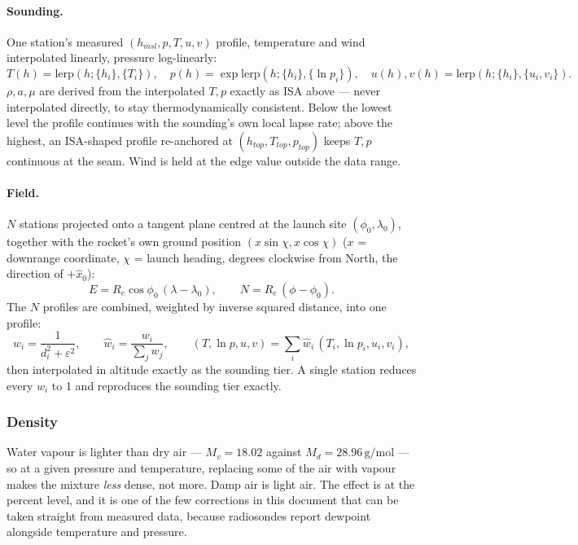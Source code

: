 \paragraph{Sounding.} One station's measured $(h_{msl}, p, T, u, v)$ profile, temperature and wind
interpolated linearly, pressure log-linearly:
\begin{equation}
    T(h) = \mathrm{lerp}(h;\{h_i\},\{T_i\}), \quad
    p(h) = \exp\mathrm{lerp}(h;\{h_i\},\{\ln p_i\}), \quad
    u(h),v(h) = \mathrm{lerp}(h;\{h_i\},\{u_i,v_i\}).
\end{equation}
$\rho, a, \mu$ are derived from the interpolated $T, p$ exactly as ISA above --- never interpolated
directly, to stay thermodynamically consistent. Below the lowest level the profile continues with
the sounding's own local lapse rate; above the highest, an ISA-shaped profile re-anchored at
$(h_{top}, T_{top}, p_{top})$ keeps $T, p$ continuous at the seam. Wind is held at the edge value
outside the data range.

\paragraph{Field.} $N$ stations projected onto a tangent plane centred at the launch site
$(\phi_0,\lambda_0)$, together with the rocket's own ground position $(x\sin\chi, x\cos\chi)$
($x$ = downrange coordinate, $\chi$ = launch heading, degrees clockwise from North, the direction
of $+\hat{x}_0$):
\begin{equation}
    E = R_e\cos\phi_0\,(\lambda-\lambda_0), \qquad N = R_e\,(\phi-\phi_0).
\end{equation}
The $N$ profiles are combined, weighted by inverse squared distance, into one profile:
\begin{equation}
    w_i = \frac{1}{d_i^2+\varepsilon^2}, \qquad \hat{w}_i = \frac{w_i}{\sum_j w_j}, \qquad
    (T, \ln p, u, v) = \sum_i \hat{w}_i\,(T_i, \ln p_i, u_i, v_i),
\end{equation}
then interpolated in altitude exactly as the sounding tier. A single station reduces every
$\hat{w}_i$ to 1 and reproduces the sounding tier exactly.

\subsubsection{Density}\label{sec:density}
Water vapour is lighter than dry air --- $M_v=18.02$ against $M_d=28.96\,\mathrm{g/mol}$ --- so at
a given pressure and temperature, replacing some of the air with vapour makes the mixture
\emph{less} dense, not more. Damp air is light air. The effect is at the percent level, and it is
one of the few corrections in this document that can be taken straight from measured data, because
radiosondes report dewpoint alongside temperature and pressure.

